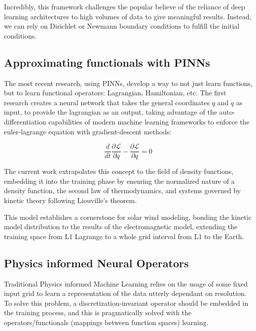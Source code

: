 \documentclass[12pt]{article}
\begin{document}
Incredibly, this framework challenges the popular believe of the reliance of deep learning architectures to high volumes of data to give meaningful results. Instead, we can rely on Dirichlet or Newmann boundary conditions to fulfill the initial conditions.

\subsection{Approximating functionals with PINNs}
The most recent research, using PINNs, develop a way to not just learn functions, but to learn functional operators: Lagrangian, Hamiltonian, etc. \cite{cranmer2020lagrangianneuralnetworks, greydanus2019hamiltonianneuralnetworks} The first research creates a neural network that takes the general coordinates $q$ and $\dot q$ as input, to provide the lagrangian as an output, taking advantage of the auto-differentiation capabilities of modern machine learning frameworks to enforce the euler-lagrange equation with gradient-descent methods:

\begin{equation}
    \frac{d}{dt} \frac{\partial \mathcal{L}}{\partial \dot q} - \frac{\partial \mathcal{L}}{\partial q} = 0
\end{equation}

The current work extrapolates this concept to the field of density functions, embedding it into the training phase by ensuring the normalized nature of a density function, the second law of thermodynamics, and systems governed by kinetic theory following Liouville's theorem.

This model establishes a cornerstone for solar wind modeling, bonding the kinetic model distribution to the results of the electromagnetic model, extending the training space from     L1 Lagrange to a whole grid interval from L1 to the Earth.

\subsection{Physics informed Neural Operators}

Traditional Physics informed Machine Learning relies on the usage of some fixed input grid to learn a representation of the data utterly dependant on resolution. To solve this problem, a discretization-invariant operator should be embedded in the training process, and this is pragmatically solved with the operators/functionals (mappings between function spaces) learning.
\end{document}
